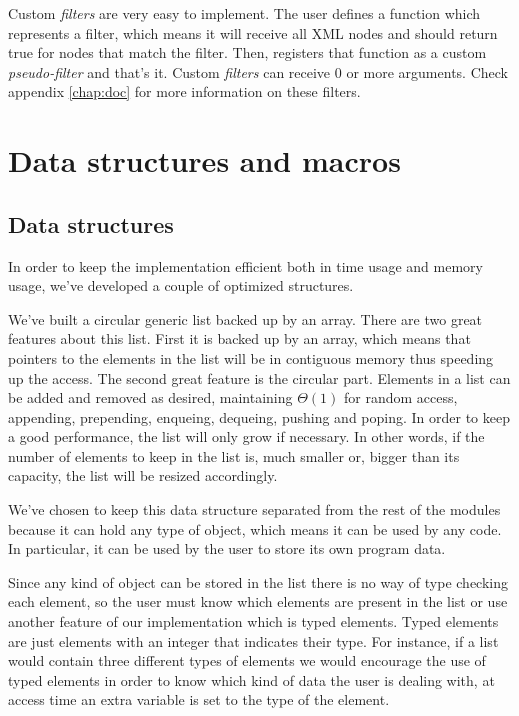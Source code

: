 \documentclass[a4paper]{report}
\begin{document}
		Custom \emph{filters} are very easy to implement. The user defines a function which represents a filter, which means it will receive all XML nodes and should return true for nodes that match the filter.
		Then, registers that function as a custom \emph{pseudo-filter} and that's it. Custom \emph{filters} can receive 0 or more arguments. Check appendix \ref{chap:doc} for more information on these filters.

\section{Data structures and macros}\label{sec:helpers}

	\subsection{Data structures}
		In order to keep the implementation efficient both in time usage and memory usage, we've developed a couple of optimized structures.

		We've built a circular generic list backed up by an array. There are two great features about this list. First it is backed up by an array, which means that pointers to the elements in the list will be in contiguous memory thus speeding up the access. The second great feature is the circular part. Elements in a list can be added and removed as desired, maintaining $\Theta(1)$ for random access, appending, prepending, enqueing, dequeing, pushing and poping. In order to keep a good performance, the list will only grow if necessary. In other words, if the number of elements to keep in the list is, much smaller or, bigger than its capacity, the list will be resized accordingly.

		We've chosen to keep this data structure separated from the rest of the modules because it can hold any type of object, which means it can be used by any code. In particular, it can be used by the user to store its own program data.

		Since any kind of object can be stored in the list there is no way of type checking each element, so the user must know which elements are present in the list or use another feature of our implementation which is typed elements. Typed elements are just elements with an integer that indicates their type. For instance, if a list would contain three different types of elements we would encourage the use of typed elements in order to know which kind of data the user is dealing with, at access time an extra variable is set to the type of the element.
\end{document}
